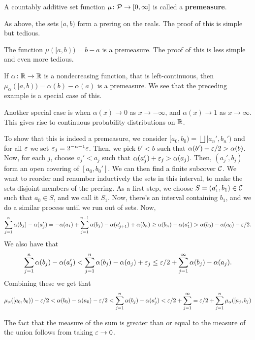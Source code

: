 \begin{definition}
    A countably additive set function $\mu \colon \mathcal P \to [0, \infty]$ is called a \textbf{premeasure}.
\end{definition}

\begin{example}
    As above, the sets $[a, b)$ form a prering on the reals. The proof of this is simple but tedious.

    The function $\mu([a, b)) = b - a$ is a premeasure. The proof of this is less simple and even more tedious.
\end{example}

\begin{example}
    If $\alpha \colon \mathbb R \to \mathbb R$ is a nondecreasing function, that is left-continuous, then $\mu_\alpha([a, b)) = \alpha(b) - \alpha(a)$ is a premeasure. We see that the preceding example is a special case of this.

    Another special case is when $\alpha(x) \to 0$ as $x \to -\infty$, and $\alpha(x) \to 1$ as $x \to \infty.$ This gives rise to continuous probability distributions on $\mathbb R$.
\end{example}

To show that this is indeed a premeasure, we consider $[a_0, b_0) = \bigsqcup [a_n', b_n')$ and for all $\varepsilon$ we set $\varepsilon_j = 2^{-n - 1}\varepsilon$. Then, we pick $b' < b$ such that $\alpha(b') + \varepsilon/2 > \alpha(b)$. Now, for each $j$, choose $a_j' < a_j$ such that $\alpha(a_j') + \varepsilon_j > \alpha(a_j)$. Then, $(a_j', b_j)$ form an open covering of $[a_0, b_0']$. We can then find a finite subcover $\mathcal C$. We want to reorder and renumber inductively the sets in this interval, to make the sets disjoint members of the prering. As a first step, we choose $S = (a_1', b_1) \in \mathcal C$ such that $a_0 \in S$, and we call it $S_1$. Now, there's an interval containing $b_1$, and we do a similar process until we run out of sets. Now, \[\sum_{j = 1}^n \alpha(b_j) - \alpha(a_j') = -\alpha(a_1) + \sum_{j = 1}^{n - 1} \alpha(b_j) - \alpha(a_{j + 1}') + \alpha(b_n) \ge \alpha(b_n) - \alpha(a_1') > \alpha(b_0) - \alpha(a_0) - \varepsilon/2.\] We also have that \[\sum_{j = 1}^n \alpha(b_j) - \alpha(a_j') < \sum_{j = 1}^n \alpha(b_j) - \alpha(a_j) + \varepsilon_j  \le \varepsilon/2 + \sum_{j = 1}^\infty \alpha(b_j) - \alpha(a_j).\] Combining these we get that \[\mu_\alpha([a_0, b_0)) - \varepsilon/2 < \alpha(b_0) - \alpha(a_0) - \varepsilon/2< \sum_{j = 1}^n \alpha(b_j) - \alpha(a_j') < \varepsilon/2 +  \sum_{j = 1}^\infty = \varepsilon/2 + \sum_{j = 1}^n \mu_\alpha([a_j, b_j)\]

The fact that the measure of the sum is greater than or equal to the measure of the union follows from taking $\varepsilon \to 0$.